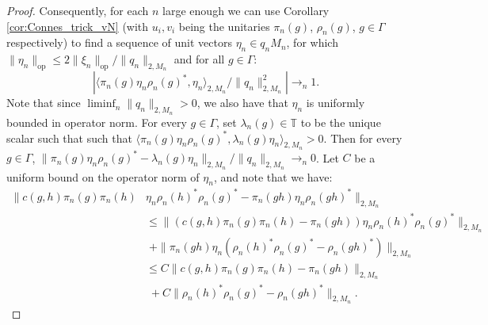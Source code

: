 \documentclass[10pt,a4paper]{amsart}
\DeclareMathOperator{\op}{op}
\newcommand{\T}{{\mathbb{T}}}
\begin{document}
\begin{proof}
           Consequently, for each $n$ large enough we can use Corollary \ref{cor:Connes_trick_vN} (with $u_i, v_i$ being the unitaries $\pi_n(g)$, $\rho_n(g)$, $g\in \Gamma$ respectively)  to find a sequence of unit vectors $\eta_n \in q_nM_n$, for which $\| \eta_n \|_{\op} \leq 2 \|\xi_n \|_{\op} / \| q_n \|_{2,M_n}$ and for all $g \in \Gamma$:
           $$|\langle \pi_n(g) \eta_n\rho_n(g)^*, \eta_n \rangle_{2,M_n} / \|q_n \|_{2,M_n}^2|  \to _n 1.$$ 
           Note that since $\liminf_{n} \| q_n \|_{2,M_n} > 0$, we also have that $\eta_n$ is uniformly bounded in operator norm.
        For every $g \in \Gamma$, set $\lambda_n(g) \in \T$ to  be the unique scalar such that such that $\langle \pi_n(g) \eta_n\rho_n(g)^*, \lambda_n(g)\eta_n \rangle_{2,M_n} > 0$.
        Then for every $g \in \Gamma$, $\| \pi_n(g)\eta_n \rho_n(g)^* - \lambda_n(g)\eta_n \|_{2,M_n} / \| q_n\|_{2,M_n} \to_n 0$.
        Let $C$ be a uniform bound on the operator norm of $\eta_n$,  and note that we have:
        \begin{align*}
            \| c(g,h)\pi_n(g)\pi_n(h)&\eta_n \rho_n(h)^*\rho_n(g)^* - \pi_n(gh) \eta_n \rho_n(gh)^*\|_{2,M_n} \\
            & \leq \|(c(g,h)\pi_n(g)\pi_n(h) - \pi_n(gh)) \eta_n \rho_n(h)^*\rho_n(g)^* \|_{2,M_n} \\
            & \; + \| \pi_n(gh) \eta_n (\rho_n(h)^*\rho_n(g)^* -\rho_n(gh)^*) \|_{2,M_n}\\
            & \leq C\|c(g,h)\pi_n(g)\pi_n(h) - \pi_n(gh)\|_{2,M_n} \\
            & \; + C\|  \rho_n(h)^*\rho_n(g)^* -\rho_n(gh)^* \|_{2,M_n}.

\end{align*}
\end{proof}
\end{document}
